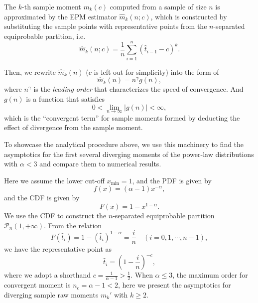 The $ k $-th sample moment $ m_k(c) $ computed from a sample of size $ n $ is approximated by the EPM estimator $ \hat{m}_k(n;c) $, which is constructed by substituting the sample points with representative points from the $ n $-separated equiprobable partition, i.e.
\begin{equation}
\hat{m}_k (n;c) = \frac{1}{n} \sum_{i=1}^n (\hat{t}_{i-1}-c)^k.
\end{equation}

Then, we rewrite $ \hat{m}_k(n) $ ($ c $ is left out for simplicity) into the form of 
\begin{equation}
\hat{m}_k(n) = n^{\gamma} g(n),
\end{equation}
where $ n^\gamma $ is the \textit{leading order} that characterizes the speed of convergence. And $ g(n) $ is a function that satisfies 
\begin{equation}
0 < \lim_{n \rightarrow \infty} |g(n)| < \infty,
\end{equation}
which is the ``convergent term'' for sample moments formed by deducting the effect of divergence from the sample moment.

To showcase the analytical procedure above, we use this machinery to find the asymptotics for the first several diverging moments of the power-law distributions with $ \alpha < 3 $ and compare them to numerical results. 

Here we assume the lower cut-off $ x_{\min}=1 $, and the PDF is given by 
\begin{equation}
f(x) = (\alpha-1) x^{-\alpha},
\end{equation}
and the CDF is given by
\begin{equation}
F(x) = 1 - x^{1-\alpha}.
\end{equation}
We use the CDF to construct the $ n $-separated equiprobable partition $ \mathcal{P}_n(1, +\infty) $. From the relation
\begin{equation}
F(\hat{t}_i) = 1-(\hat{t}_i)^{1-\alpha} = \frac{i}{n} \quad (i=0,1,\cdots, n-1),
\end{equation}
we have the representative point as 
\begin{equation}
\hat{t}_i = (1-\frac{i}{n})^{-c}, 
\end{equation}
where we adopt a shorthand $ c = \frac{1}{\alpha-1} > \frac{1}{2}$. When $ \alpha \leq 3$, the maximum order for convergent moment is $ n_c=\alpha-1 < 2 $, here we present the asymptotics for diverging sample raw moments $ m_k' $ with $ k \geq 2 $.

